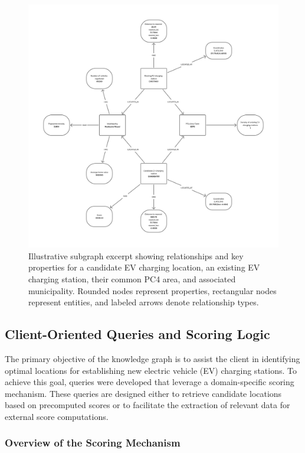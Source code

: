 \documentclass{article}
\begin{document}
\begin{figure}[htbp]
	\centering
	\includegraphics[width=\textwidth]{ExampleKnowledgeGraph.png}
	\caption{Illustrative subgraph excerpt showing relationships and key properties for a candidate EV charging location, an existing EV charging station, their common PC4 area, and associated municipality. Rounded nodes represent properties, rectangular nodes represent entities, and labeled arrows denote relationship types.}
	\label{fig:graph_excerpt_example}
\end{figure}

\subsection{Client-Oriented Queries and Scoring Logic}

The primary objective of the knowledge graph is to assist the client in identifying optimal locations for establishing new electric vehicle (EV) charging stations. To achieve this goal, queries were developed that leverage a domain-specific scoring mechanism. These queries are designed either to retrieve candidate locations based on precomputed scores or to facilitate the extraction of relevant data for external score computations.

\subsubsection{Overview of the Scoring Mechanism}
\end{document}

